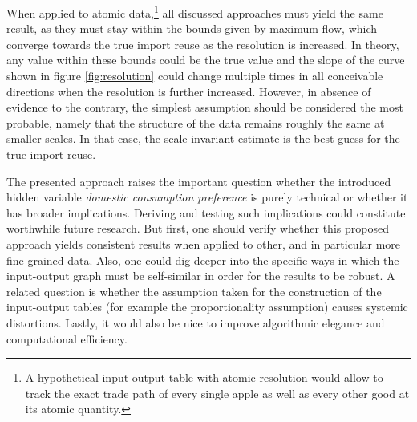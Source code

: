 \documentclass{paper}
\begin{document}
When applied to atomic data,\footnote{A hypothetical input-output table with atomic resolution would allow to track the exact trade path of every single apple as well as every other good at its atomic quantity.} all discussed approaches must yield the same result, as they must stay within the bounds given by maximum flow, which converge towards the true import reuse as the resolution is increased. In theory, any value within these bounds could be the true value and the slope of the curve shown in figure \ref{fig:resolution} could change multiple times in all conceivable directions when the resolution is further increased. However, in absence of evidence to the contrary, the simplest assumption should be considered the most probable, namely that the structure of the data remains roughly the same at smaller scales. In that case, the scale-invariant estimate is the best guess for the true import reuse.

The presented approach raises the important question whether the introduced hidden variable \emph{domestic consumption preference} is purely technical or whether it has broader implications. Deriving and testing such implications could constitute worthwhile future research. But first, one should verify whether this proposed approach yields consistent results when applied to other, and in particular more fine-grained data. Also, one could dig deeper into the specific ways in which the input-output graph must be self-similar in order for the results to be robust. A related question is whether the assumption taken for the construction of the input-output tables (for example the proportionality assumption) causes systemic distortions. Lastly, it would also be nice to improve algorithmic elegance and computational efficiency.


\end{document}
